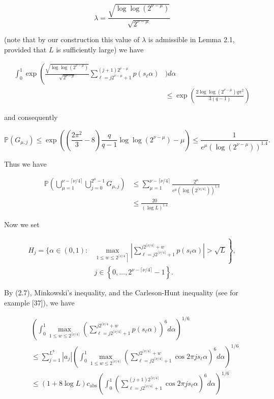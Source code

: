 \documentclass[10pt]{article}
\begin{document}
$$
\lambda=\frac{\sqrt{\log \log \left(2^{\nu-\mu}\right)}}{\sqrt{2^{\nu-\mu}}}
$$

(note that by our construction this value of $\lambda$ is admissible in Lemma 2.1, provided that $L$ is sufficiently large) we have

$$
\begin{aligned}
\int_{0}^{1} \exp \left(\frac{\sqrt{\log \log \left(2^{\nu-\mu}\right)}}{\sqrt{2^{\nu-\mu}}} \sum_{\ell=j 2^{\nu-\mu}+1}^{(j+1) 2^{\nu-\mu}} p\left(s_{\ell} \alpha\right)\right. & ) d \alpha \\
& \leqslant \exp \left(\frac{2 \log \log \left(2^{\nu-\mu}\right) q \pi^{2}}{3(q-1)}\right)
\end{aligned}
$$

and consequently

$$
\mathbb{P}\left(G_{\mu, j}\right) \leqslant \exp \left(\left(\frac{2 \pi^{2}}{3}-8\right) \frac{q}{q-1} \log \log \left(2^{\nu-\mu}\right)-\mu\right) \leqslant \frac{1}{e^{\mu}\left(\log \left(2^{\nu-\mu}\right)\right)^{1.4}} .
$$

Thus we have


\begin{align*}
\mathbb{P}\left(\bigcup_{\mu=1}^{\nu-\lceil\nu / 4\rceil} \bigcup_{j=0}^{2^{\mu}-1} G_{\mu, j}\right) & \leqslant \sum_{\mu=1}^{\nu-\lceil\nu / 4\rceil} \frac{2^{\mu}}{e^{\mu}\left(\log \left(2^{\lceil\nu / 4\rceil}\right)\right)^{1.4}} \\
& \leqslant \frac{20}{(\log L)^{1.4}} \tag{3.12}
\end{align*}


Now we set

$$
\begin{aligned}
H_{j}=\{\alpha \in(0,1): & \left.\max _{\left.1 \leqslant w \leqslant 2^{\lceil\nu / 4}\right\rceil}\left|\sum_{\ell=j 2^{\lceil\nu / 4\rceil}+1}^{j 2^{\lceil\nu / 4\rceil}+w} p\left(s_{\ell} \alpha\right)\right|>\sqrt{L}\right\}, \\
& j \in\left\{0, \ldots, 2^{\nu-\lceil\nu / 4\rceil}-1\right\} .
\end{aligned}
$$

By (2.7), Minkowski's inequality, and the Carleson-Hunt inequality (see for example [37]), we have


\begin{align*}
& \left(\int_{0}^{1} \max _{1 \leqslant w \leqslant 2^{\lceil\nu / 4\rceil}}\left(\sum_{\ell=j 2^{\lceil\nu / 4\rceil}+1}^{j 2^{\lceil\nu / 4}+w} p\left(s_{\ell} \alpha\right)\right)^{6} d \alpha\right)^{1 / 6} \\
& \leqslant \sum_{j=1}^{L^{8}}\left|a_{j}\right|\left(\int_{0}^{1} \max _{1 \leqslant w \leqslant 2^{\lceil\nu / 4\rceil}}\left(\sum_{\ell=j 2^{\lceil\nu / 4\rceil}+1}^{j 2^{\lceil\nu / 4\rceil}+w} \cos 2 \pi j s_{\ell} \alpha\right)^{6} d \alpha\right)^{1 / 6} \\
& \leqslant(1+8 \log L) c_{\mathrm{abs}}\left(\int_{0}^{1}\left(\sum_{\ell=j 2^{\lceil\nu / 4\rceil}+1}^{(j+1) 2^{\lceil\nu / 4\rceil}} \cos 2 \pi j s_{\ell} \alpha\right)^{6} d \alpha\right)^{1 / 6} \tag{3.13}
\end{align*}
\end{document}
